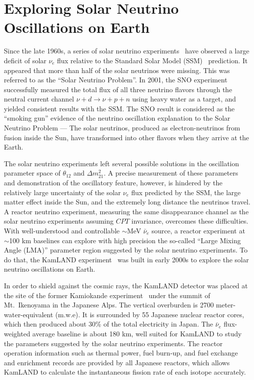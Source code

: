 \section{Exploring Solar Neutrino Oscillations on Earth} 
\label{sec:kamland}

Since the late 1960s, a series of solar neutrino experiments~\cite{Homestake,GALLEX,SAGE,Kamiokande,Super-Kamiokande} have observed a large deficit of solar $\nu_e$ flux relative to the Standard Solar Model (SSM)~\cite{Bahcall} prediction. 
It appeared that more than half of the solar neutrinos were missing. 
This was referred to as the ``Solar Neutrino Problem''. 
In 2001, the SNO experiment~\cite{SNO} successfully measured the total flux of all three neutrino flavors through the neutral current channel $\nu + d \to \nu + p + n$ using heavy water as a target, and yielded consistent results with the SSM. 
The SNO result is considered as the ``smoking gun'' evidence of the neutrino oscillation explanation to the Solar Neutrino Problem --- The solar neutrinos, produced as electron-neutrinos from fusion inside the Sun, have transformed into other flavors when they arrive at the Earth.

The solar neutrino experiments left several possible solutions in the oscillation parameter space of $\theta_{12}$ and $\Delta m^2_{21}$. 
A precise measurement of these parameters and demonstration of the oscillatory feature, however, is hindered by the relatively large uncertainty of the solar $\nu_{e}$ flux predicted by the SSM, the large matter effect inside the Sun, and the extremely long distance the neutrinos travel. 
A reactor neutrino experiment, measuring the same disappearance channel as the solar neutrino experiments assuming $CPT$ invariance, overcomes these difficulties. 
With well-understood and controllable $\sim$MeV $\bar\nu_e$ source, a reactor experiment at $\sim$100 km baselines can explore with high precision the so-called ``Large Mixing Angle (LMA)'' parameter region suggested by the solar neutrino experiments. To do that, the KamLAND experiment~\cite{Kamland03} was built in early 2000s to explore the solar neutrino oscillations on Earth.

In order to shield against the cosmic rays, the KamLAND detector was placed at the site of the former Kamiokande experiment~\cite{Kamiokande} under the summit of Mt.~Ikenoyama in the Japanese Alps. 
The vertical overburden is 2700 meter-water-equivalent (m.w.e). 
It is surrounded by 55 Japanese nuclear reactor cores, which then produced about 30\% of the total electricity in Japan. 
The $\bar\nu_e$ flux-weighted average baseline is about 180 km, well suited for KamLAND to study the parameters suggested by the solar neutrino experiments. 
The reactor operation information such as thermal power, fuel burn-up, and fuel exchange and enrichment records are provided by all Japanese reactors, which allows KamLAND to calculate the instantaneous fission rate of each isotope accurately. 

